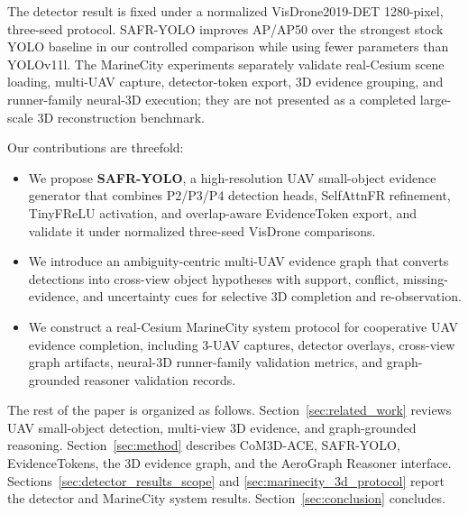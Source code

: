 The detector result is fixed under a normalized VisDrone2019-DET 1280-pixel,
three-seed protocol. SAFR-YOLO improves AP/AP50 over the strongest stock YOLO
baseline in our controlled comparison while using fewer parameters than
YOLOv11l. The MarineCity experiments separately validate real-Cesium scene
loading, multi-UAV capture, detector-token export, 3D evidence grouping, and
runner-family neural-3D execution; they are not presented as a completed
large-scale 3D reconstruction benchmark.

Our contributions are threefold:

\begin{itemize}
    \item We propose \textbf{SAFR-YOLO}, a high-resolution UAV small-object
    evidence generator that combines P2/P3/P4 detection heads, SelfAttnFR
    refinement, TinyFReLU activation, and overlap-aware EvidenceToken export,
    and validate it under normalized three-seed VisDrone comparisons.
    \item We introduce an ambiguity-centric multi-UAV evidence graph that
    converts detections into cross-view object hypotheses with support,
    conflict, missing-evidence, and uncertainty cues for selective 3D
    completion and re-observation.
    \item We construct a real-Cesium MarineCity system protocol for cooperative
    UAV evidence completion, including 3-UAV captures, detector overlays,
    cross-view graph artifacts, neural-3D runner-family validation metrics, and
    graph-grounded reasoner validation records.
\end{itemize}

The rest of the paper is organized as follows. Section~\ref{sec:related_work}
reviews UAV small-object detection, multi-view 3D evidence, and graph-grounded
reasoning. Section~\ref{sec:method} describes CoM3D-ACE, SAFR-YOLO,
EvidenceTokens, the 3D evidence graph, and the AeroGraph Reasoner interface.
Sections~\ref{sec:detector_results_scope} and
\ref{sec:marinecity_3d_protocol} report the detector and MarineCity system
results. Section~\ref{sec:conclusion} concludes.
